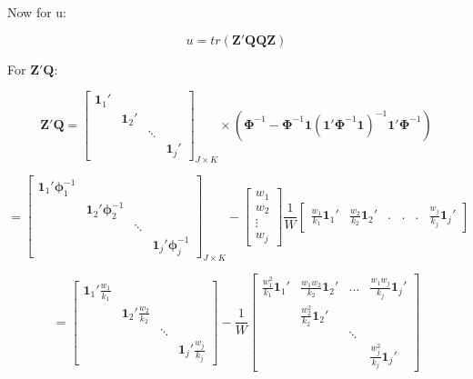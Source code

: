 Now for u: 

\begin{equation}
    u = tr(\mathbf{Z}'\mathbf{Q}\mathbf{Q}\mathbf{Z}) 
    \nonumber
\end{equation}



For $\mathbf{Z}'\mathbf{Q}$:


\begin{equation}
  \mathbf{Z}'\mathbf{Q} = \begin{bmatrix}
        \mathbf{1}_1' & & & \\
         & \mathbf{1}_2' & &\\
         & & \ddots &  \\
         & &  & \mathbf{1}_j'
    \end{bmatrix}_{J \times K} \times (\mathbf{\Phi}^{-1}- \mathbf{\Phi}^{-1}\mathbf{1}(\mathbf{1}'\mathbf{\Phi}^{-1}\mathbf{1})^{-1}\mathbf{1}'\mathbf{\Phi}^{-1}) 
    \nonumber
\end{equation}


\begin{equation}
   = \begin{bmatrix}
        \mathbf{1}_1'\mathbf{\phi}_1^{-1} & & & \\
         & \mathbf{1}_2'\mathbf{\phi}_2^{-1} & &\\
         & & \ddots &  \\
         & &  & \mathbf{1}_j'\mathbf{\phi}_j^{-1}
    \end{bmatrix}_{J \times K}  - \begin{bmatrix}
        w_1 \\
        w_2 \\
        \vdots \\
        w_j
    \end{bmatrix} \frac{1}{W} 
    \begin{bmatrix}
        \frac{w_1}{k_1}\mathbf{1}_1' & \frac{w_2}{k_2}\mathbf{1}_2' & . & . & . & \frac{w_j}{k_j}\mathbf{1}_j'
    \end{bmatrix}
    \nonumber
\end{equation}


\begin{equation}
   = \begin{bmatrix}
        \mathbf{1}_1'\frac{w_1}{k_1} & &  \\
         & \mathbf{1}_2'\frac{w_2}{k_2} &  \\
         & & \ddots &  \\

         & & &   \mathbf{1}_j'\frac{w_j}{k_j}
    \end{bmatrix} -  \frac{1}{W} 
      \begin{bmatrix}
         \frac{w_1^2}{k_1}\mathbf{1}_1' & \frac{w_1w_2}{k_2}\mathbf{1}_2' &  \dots & \frac{ w_1w_j}{k_j}\mathbf{1}_j'  \\
         &  \frac{w_2^2}{k_2}\mathbf{1}_2' &  &\\
         & & \ddots &  \\

         & & & \frac{w_j^2}{k_j}\mathbf{1}_j'
    \end{bmatrix} 
    \nonumber
\end{equation}


